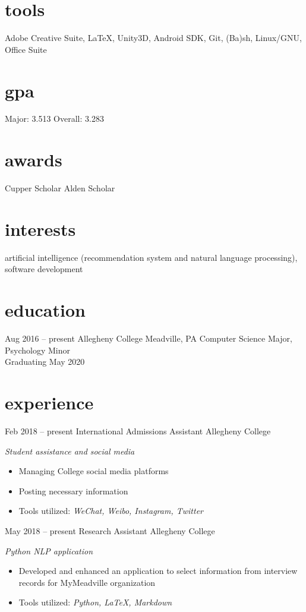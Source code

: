 \documentclass[]{friggeri-cv}
\begin{document}
\begin{aside}
  \section{tools}\vspace{0.05cm}
    Adobe Creative Suite, \LaTeX , Unity3D, Android SDK, Git, (Ba)sh, Linux/GNU, 
    Office Suite
  \section{gpa}\vspace{0.1cm}
  	Major: 3.513
    Overall: 3.283\vspace{0.1cm}
  \section{awards}\vspace{0.05cm}
  Cupper Scholar\vspace{0.1cm}
  Alden Scholar\vspace{0.1cm}
\end{aside}

\section{interests}

artificial intelligence (recommendation system and natural language processing), software development

\section{education}
\begin{entrylist}
  \entry
    {Aug 2016 -- present}
    {Allegheny College}
    {Meadville, PA}
    {Computer Science Major, Psychology Minor\\Graduating May 2020}
\end{entrylist}
\section{experience}
\begin{entrylist}
  \entry
    {Feb 2018 -- present}
    {International Admissions Assistant}
    {Allegheny College}
    {\emph{Student assistance and social media}
    \begin{itemize}[leftmargin=1.2em]
    \item Managing College social media platforms
    \item Posting necessary information
    \item Tools utilized: \emph{WeChat, Weibo, Instagram, Twitter}
    \end{itemize}}
  \entry
    {May 2018 -- present}
    {Research Assistant}
    {Allegheny College}
    {\emph{Python NLP application}
    \begin{itemize}[leftmargin=1.2em]
    \item Developed and enhanced an application to select information from interview records for MyMeadville organization
    \item Tools utilized: \emph{Python, \LaTeX, Markdown}
    \end{itemize}}
\end{entrylist}
\end{document}

